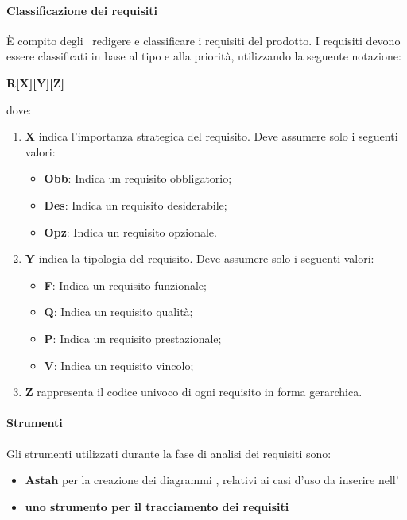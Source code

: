 \documentclass[a4paper,12pt]{article}
\begin{document}
			\paragraph{Classificazione dei requisiti}
			È compito degli \analisti\ redigere e classificare i requisiti del prodotto.  I requisiti devono essere classificati in base al tipo e alla priorità, utilizzando la seguente notazione:
			\begin{center}\textbf{R[X][Y][Z]}\end{center} dove:
				\begin{enumerate}
					\item \textbf{X} indica l'importanza strategica del requisito. Deve assumere solo i seguenti valori:
						\begin{itemize}
							\item \textbf{Obb}: Indica un requisito obbligatorio;
							\item \textbf{Des}: Indica un requisito desiderabile;
							\item \textbf{Opz}: Indica un requisito opzionale.
						\end{itemize}
					\item \textbf{Y} indica la tipologia del requisito. Deve assumere solo i seguenti valori:
						\begin{itemize}
							\item \textbf{F}: Indica un requisito funzionale;
							\item \textbf{Q}: Indica un requisito qualità;
							\item \textbf{P}: Indica un requisito prestazionale;
							\item \textbf{V}: Indica un requisito vincolo;
						\end{itemize}
					\item \textbf{Z} rappresenta il codice univoco di ogni requisito in forma gerarchica.
				\end{enumerate}
			\paragraph{Strumenti}
			Gli strumenti utilizzati durante la fase di analisi dei requisiti sono:
			\begin{itemize}
				\item \textbf{Astah} per la creazione dei diagrammi , relativi ai casi d'uso da inserire nell'\analisideirequisiti\
				\item \textbf{uno strumento per il tracciamento dei requisiti}
			\end{itemize}
\end{document}
